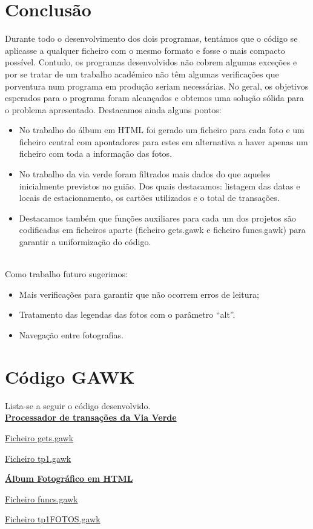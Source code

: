 \documentclass{report}
\begin{document}
\chapter{Conclusão} \label{concl}
Durante todo o desenvolvimento dos dois programas, tentámos que o código se aplicasse a qualquer ficheiro com o mesmo formato e fosse o mais compacto possível. Contudo, os programas desenvolvidos não cobrem algumas exceções e por se tratar de um trabalho académico não têm algumas verificações que porventura num programa em produção seriam necessárias.
No geral, os objetivos esperados para o programa foram alcançados e obtemos uma solução sólida para o problema apresentado. Destacamos ainda alguns pontos:
\\
\begin{itemize}
    \item No trabalho do álbum em HTML foi gerado um ficheiro para cada foto e um ficheiro central com apontadores para estes em alternativa a haver apenas um ficheiro com toda a informação das fotos.
    \item No trabalho da via verde foram filtrados mais dados do que aqueles inicialmente previstos no guião. Dos quais destacamos: listagem das datas e locais de estacionamento, os cartões utilizados e o total de transações.
    \item Destacamos também que funções auxiliares para cada um dos projetos são codificadas em ficheiros aparte (ficheiro gets.gawk e ficheiro funcs.gawk) para garantir a uniformização do código.
\end{itemize}
\\
Como trabalho futuro sugerimos:
\\
\begin{itemize}
    \item Mais verificações para garantir que não ocorrem erros de leitura;
    \item Tratamento das legendas das fotos com o parâmetro “alt”.
    \item Navegação entre fotografias.
\end{itemize}

\appendix
\chapter{Código GAWK}

Lista-se a seguir o código desenvolvido.
\\
\textbf{\underline{Processador de transações da Via Verde}}

\underline{Ficheiro gets.gawk}


\newpage
\underline{Ficheiro tp1.gawk}


\newpage
\textbf{\underline{Álbum Fotográfico em HTML}}

\underline{Ficheiro funcs.gawk}


\newpage
\underline{Ficheiro tp1FOTOS.gawk}





\end{document}
